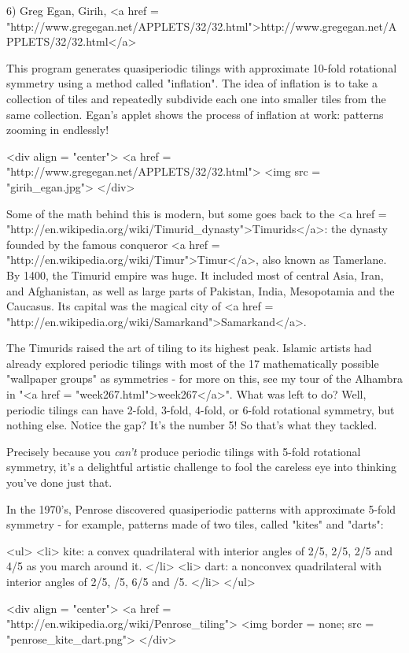 6) Greg Egan, Girih, <a href = "http://www.gregegan.net/APPLETS/32/32.html">http://www.gregegan.net/APPLETS/32/32.html</a>

This program generates quasiperiodic tilings with approximate 10-fold 
rotational symmetry using a method called "inflation".  The idea of
inflation is to take a collection of tiles and repeatedly subdivide 
each one into smaller tiles from the same collection.   Egan's applet
shows the process of inflation at work: patterns zooming in endlessly!  

<div align = "center">
<a href = "http://www.gregegan.net/APPLETS/32/32.html">
<img src = "girih_egan.jpg">
</div>

Some of the math behind this is modern, but some goes back to the <a
href = "http://en.wikipedia.org/wiki/Timurid_dynasty">Timurids</a>:
the dynasty founded by the famous conqueror <a href =
"http://en.wikipedia.org/wiki/Timur">Timur</a>, also known as
Tamerlane.  By 1400, the Timurid empire was huge.  It included most of
central Asia, Iran, and Afghanistan, as well as large parts of
Pakistan, India, Mesopotamia and the Caucasus.  Its capital was the
magical city of <a href =
"http://en.wikipedia.org/wiki/Samarkand">Samarkand</a>.

The Timurids raised the art of tiling to its highest peak.  Islamic
artists had already explored periodic tilings with most of the 17
mathematically possible "wallpaper groups" as symmetries - for more on
this, see my tour of the Alhambra in "<a href =
"week267.html">week267</a>".  What was left to do?  Well,
periodic tilings can have 2-fold, 3-fold, 4-fold, or 6-fold rotational
symmetry, but nothing else.  Notice the gap?  It's the number 5!  So
that's what they tackled.

Precisely because you \emph{can't} produce periodic tilings with 5-fold
rotational symmetry, it's a delightful artistic challenge to fool
the careless eye into thinking you've done just that.

In the 1970's, Penrose discovered quasiperiodic patterns with 
approximate 5-fold symmetry - for example, patterns made of two 
tiles, called "kites" and "darts":

<ul>
<li>
kite: a convex quadrilateral with interior angles of 2\pi /5, 
2\pi /5, 2\pi /5 and 4\pi /5 as you march around it.  
</li>
<li>
dart: a nonconvex quadrilateral with interior angles of 2\pi /5, 
\pi /5, 6\pi /5 and \pi /5.  
</li>
</ul>

<div align = "center">
<a href = "http://en.wikipedia.org/wiki/Penrose_tiling">
<img border = none; src = "penrose_kite_dart.png">
</div>

